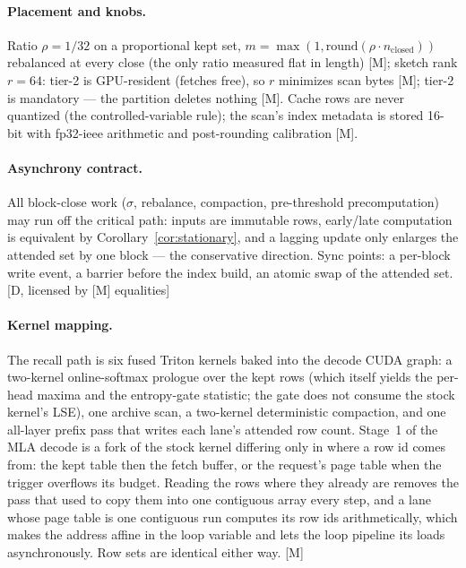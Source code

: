 \paragraph{Placement and knobs.} Ratio $\rho=1/32$ on a proportional kept
set, $m=\max(1,\mathrm{round}(\rho\cdot n_{\mathrm{closed}}))$ rebalanced at
every close (the only ratio measured flat in length) [M];
sketch rank $r{=}64$: tier-2 is GPU-resident (fetches free), so $r$
minimizes scan bytes [M]; tier-2 is mandatory --- the partition deletes
nothing [M]. Cache rows are never quantized (the controlled-variable rule);
the scan's index metadata is stored 16-bit with fp32-ieee arithmetic and
post-rounding calibration [M].

\paragraph{Asynchrony contract.} All block-close work ($\sigma$, rebalance,
compaction, pre-threshold precomputation) may run off the critical path:
inputs are immutable rows, early/late computation is equivalent by
Corollary~\ref{cor:stationary}, and a lagging update only enlarges the
attended set by one block --- the conservative direction. Sync points: a
per-block write event, a barrier before the index build, an atomic swap of
the attended set. [D, licensed by [M] equalities]

\paragraph{Kernel mapping.} The recall path is six fused Triton kernels baked
into the decode CUDA graph: a two-kernel online-softmax prologue over the kept
rows (which itself yields the per-head maxima and the entropy-gate statistic;
the gate does not consume the stock kernel's LSE), one archive scan, a
two-kernel deterministic compaction, and one all-layer prefix pass that writes
each lane's attended row count. Stage~1 of the MLA decode is a fork of the
stock kernel differing only in where a row id comes from: the kept table then
the fetch buffer, or the request's page table when the trigger overflows its
budget. Reading the rows where they already are removes the pass that used to
copy them into one contiguous array every step, and a lane whose page table is
one contiguous run computes its row ids arithmetically, which makes the address
affine in the loop variable and lets the loop pipeline its loads
asynchronously. Row sets are identical either way. [M]

